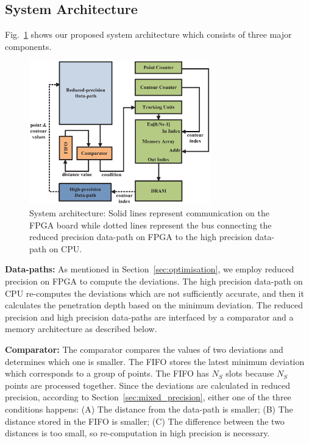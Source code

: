 \subsection{System Architecture}
Fig.~\ref{fig:arch} shows our proposed system architecture which consists of three major components.

\begin{figure}[t!]
\begin{center}
\includegraphics[width=0.7\textwidth]{mixed_precision/figures/arch}
\end{center}
\caption{System architecture:
Solid lines represent communication on the FPGA board while dotted lines represent the bus connecting the reduced precision data-path on FPGA to the high precision data-path on CPU.
}
\label{fig:arch}
\end{figure}

\noindent \textbf{Data-paths:}
As mentioned in Section~\ref{sec:optimisation}, we employ reduced precision on FPGA to compute the deviations.
The high precision data-path on CPU re-computes the deviations which are not sufficiently accurate,
and then it calculates the penetration depth based on the minimum deviation.
The reduced precision and high precision data-paths are interfaced by a comparator and a memory architecture as described below.

\noindent \textbf{Comparator:}
The comparator compares the values of two deviations and determines which one is smaller.
The FIFO stores the latest minimum deviation which corresponds to a group of points.
The FIFO has $N_{S}$ slots because $N_S$ points are processed together.
Since the deviations are calculated in reduced precision, according to Section~\ref{sec:mixed_precision}, 
either one of the three conditions happens:
(A) The distance from the data-path is smaller; 
(B) The distance stored in the FIFO is smaller; 
(C) The difference between the two distances is too small, so re-computation in high precision is necessary.

